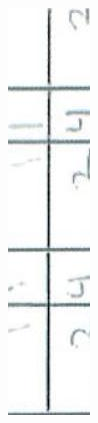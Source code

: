 \documentclass[10pt]{article}
\begin{document}
\includegraphics[max width=\textwidth, center]{2025_02_27_dd68c3d38de88f0516d9g-019(11)}\\
\end{document}
